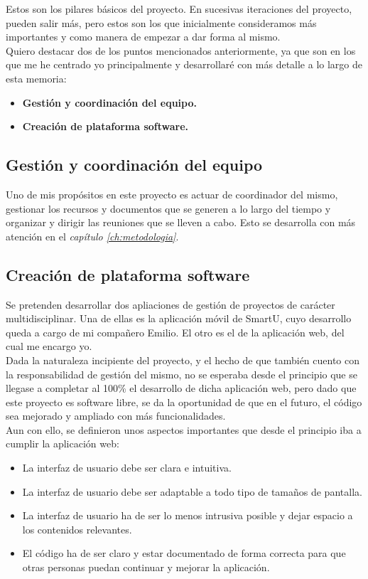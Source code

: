Estos son los pilares básicos del proyecto. En sucesivas iteraciones del proyecto, pueden salir más, pero estos son los que inicialmente consideramos más importantes y como manera de empezar a dar forma al mismo.\\

Quiero destacar dos de los puntos mencionados anteriormente, ya que son en los que me he centrado yo principalmente y desarrollaré con más detalle a lo largo de esta memoria:

\begin{itemize}
    \item \textbf{Gestión y coordinación del equipo.}
    \item \textbf{Creación de plataforma software.}
\end{itemize}

\subsection{Gestión y coordinación del equipo}
Uno de mis propósitos en este proyecto es actuar de coordinador del mismo, gestionar los recursos y documentos que se generen a lo largo del tiempo y organizar y dirigir las reuniones que se lleven a cabo. Esto se desarrolla con más atención en el \textit{capítulo \ref{ch:metodologia}}.

\subsection{Creación de plataforma software}
Se pretenden desarrollar dos apliaciones de gestión de proyectos de carácter multidisciplinar. Una de ellas es la aplicación móvil de SmartU, cuyo desarrollo queda a cargo de mi compañero Emilio. El otro es el de la aplicación web, del cual me encargo yo.\\

Dada la naturaleza incipiente del proyecto, y el hecho de que también cuento con la responsabilidad de gestión del mismo, no se esperaba desde el principio que se llegase a completar al 100\% el desarrollo de dicha aplicación web, pero dado que este proyecto es software libre, se da la oportunidad de que en el futuro, el código sea mejorado y ampliado con más funcionalidades.\\

Aun con ello, se definieron unos aspectos importantes que desde el principio iba a cumplir la aplicación web:

\begin{itemize}
    \item La interfaz de usuario debe ser clara e intuitiva.
    \item La interfaz de usuario debe ser adaptable a todo tipo de tamaños de pantalla.
    \item La interfaz de usuario ha de ser lo menos intrusiva posible y dejar espacio a los contenidos relevantes.
    \item El código ha de ser claro y estar documentado de forma correcta para que otras personas puedan continuar y mejorar la aplicación.
\end{itemize}

